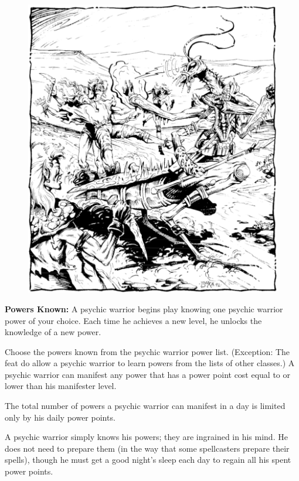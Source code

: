 \begin{figure}[b!]
\centering
\includegraphics[width=\textwidth]{images/psywarrior-1.png}
\WOTC
\end{figure}

\textbf{Powers Known:} A psychic warrior begins play knowing one psychic warrior power of your choice. Each time he achieves a new level, he unlocks the knowledge of a new power.

Choose the powers known from the psychic warrior power list. (Exception: The feat  do allow a psychic warrior to learn powers from the lists of other classes.) A psychic warrior can manifest any power that has a power point cost equal to or lower than his manifester level.

The total number of powers a psychic warrior can manifest in a day is limited only by his daily power points.

A psychic warrior simply knows his powers; they are ingrained in his mind. He does not need to prepare them (in the way that some spellcasters prepare their spells), though he must get a good night's sleep each day to regain all his spent power points.

